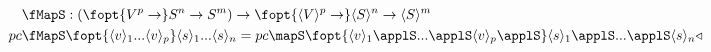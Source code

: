 \documentclass[preview]{standalone}
\begin{document}
\begin{align*}%
    \fMapS &: (\fopt{V^p \rightarrow} S^n \rightarrow S^m) \rightarrow \fopt{\vect{V}^p \rightarrow} \vect{S}^n \rightarrow \vect{S}^m\\
    pc \fMapS &\fopt{\vect{v}_1 ... \vect{v}_p} \vect{s}_1 ... \vect{s}_n =%
                pc \mapS \fopt{\vect{v}_1 \applS ... \applS \vect{v}_p  \applS} \vect{s}_1 \applS ... \applS \vect{s}_n \funzip%
\end{align*}
\end{document}
